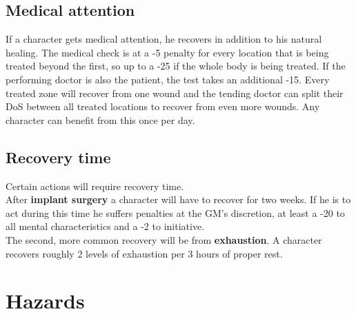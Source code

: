 \documentclass[12pt,a4paper,openany]{book}
\begin{document}
	\section{Medical attention}
	If a character gets medical attention, he recovers in addition to his natural healing. The medical check is at a -5 penalty for every location that is being treated beyond the first, so up to a -25 if the whole body is being treated. If the performing doctor is also the patient, the test takes an additional -15. Every treated zone will recover from one wound and the tending doctor can split their DoS between all treated locations to recover from even more wounds. Any character can benefit from this once per day.
	\section{Recovery time}
	Certain actions will require recovery time.\\
	After \textbf{implant surgery} a character will have to recover for two weeks. If he is to act during this time he suffers penalties at the GM’s discretion, at least a -20 to all mental characteristics and a -2 to initiative.\\
	The second, more common recovery will be from \textbf{exhaustion}. A character recovers roughly 2 levels of exhaustion per 3 hours of proper rest.
	
	\chapter{Hazards}
\end{document}
